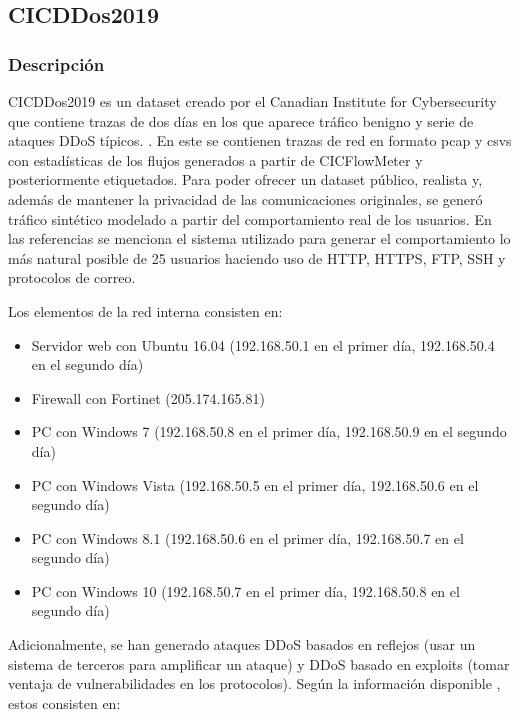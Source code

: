 \subsection{CICDDos2019}

\subsubsection{Descripción}

CICDDos2019 es un dataset creado por el Canadian Institute for Cybersecurity que contiene trazas de dos días en los que aparece tráfico benigno y serie de ataques DDoS típicos. \cite{cicddos2019web}. En este se contienen trazas de red en formato pcap y csvs con estadísticas de los flujos generados a partir de CICFlowMeter y posteriormente etiquetados. Para poder ofrecer un dataset público, realista y, además de mantener la privacidad de las comunicaciones originales, se generó tráfico sintético modelado a partir del comportamiento real de los usuarios. En las referencias se menciona el sistema utilizado para generar el comportamiento lo más natural posible de 25 usuarios haciendo uso de HTTP, HTTPS, FTP, SSH y protocolos de correo.

Los elementos de la red interna consisten en:

\begin{itemize}
    \item Servidor web con Ubuntu 16.04 (192.168.50.1 en el primer día, 192.168.50.4 en el segundo día)
    \item Firewall con Fortinet (205.174.165.81)
    \item PC con Windows 7 (192.168.50.8 en el primer día, 192.168.50.9 en el segundo día)
    \item PC con Windows Vista (192.168.50.5 en el primer día, 192.168.50.6 en el segundo día)
    \item PC con Windows 8.1 (192.168.50.6 en el primer día, 192.168.50.7 en el segundo día)
    \item PC con Windows 10 (192.168.50.7 en el primer día, 192.168.50.8 en el segundo día)
\end{itemize}

Adicionalmente, se han generado ataques DDoS basados en reflejos (usar un sistema de terceros para amplificar un ataque) y DDoS basado en exploits (tomar ventaja de vulnerabilidades en los protocolos). Según la información disponible \cite{cicddos2019web}, estos consisten en:

